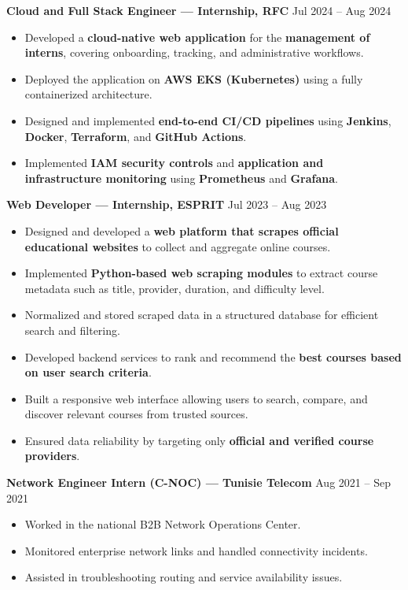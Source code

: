 \documentclass[10pt, letterpaper]{article}
\newenvironment{highlights}{
\begin{itemize}[leftmargin=12pt, itemsep=2pt]
}{
\end{itemize}
}
\begin{document}
\textbf{Cloud and Full Stack Engineer --- Internship, RFC} \hfill Jul 2024 -- Aug 2024
\begin{highlights}
\item Developed a \textbf{cloud-native web application} for the \textbf{management of interns}, covering onboarding, tracking, and administrative workflows.
\item Deployed the application on \textbf{AWS EKS (Kubernetes)} using a fully containerized architecture.
\item Designed and implemented \textbf{end-to-end CI/CD pipelines} using \textbf{Jenkins}, \textbf{Docker}, \textbf{Terraform}, and \textbf{GitHub Actions}.
\item Implemented \textbf{IAM security controls} and \textbf{application and infrastructure monitoring} using \textbf{Prometheus} and \textbf{Grafana}.
\end{highlights}

\textbf{Web Developer --- Internship, ESPRIT} \hfill Jul 2023 -- Aug 2023
\begin{highlights}
\item Designed and developed a \textbf{web platform that scrapes official educational websites} to collect and aggregate online courses.
\item Implemented \textbf{Python-based web scraping modules} to extract course metadata such as title, provider, duration, and difficulty level.
\item Normalized and stored scraped data in a structured database for efficient search and filtering.
\item Developed backend services to rank and recommend the \textbf{best courses based on user search criteria}.
\item Built a responsive web interface allowing users to search, compare, and discover relevant courses from trusted sources.
\item Ensured data reliability by targeting only \textbf{official and verified course providers}.
\end{highlights}

\textbf{Network Engineer Intern (C-NOC) --- Tunisie Telecom} \hfill Aug 2021 -- Sep 2021
\begin{highlights}
\item Worked in the national B2B Network Operations Center.
\item Monitored enterprise network links and handled connectivity incidents.
\item Assisted in troubleshooting routing and service availability issues.
\end{highlights}
\end{document}
